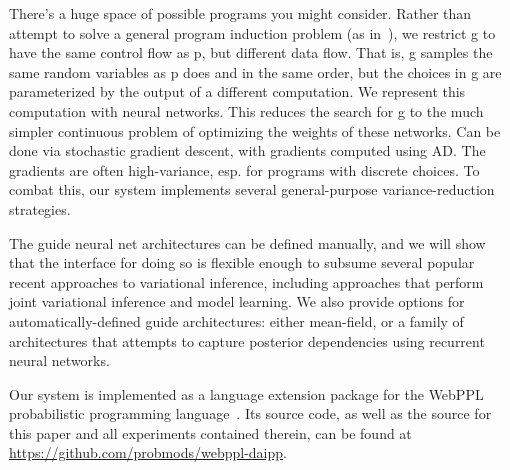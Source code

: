 There's a huge space of possible programs you might consider.
Rather than attempt to solve a general program induction problem (as in~\cite{GuidePrograms}), we restrict g to have the same control flow as p, but different data flow.
That is, g samples the same random variables as p does and in the same order, but the choices in g are parameterized by the output of a different computation.
We represent this computation with neural networks.
This reduces the search for g to the much simpler continuous problem of optimizing the weights of these networks.
Can be done via stochastic gradient descent, with gradients computed using AD.
The gradients are often high-variance, esp. for programs with discrete choices.
To combat this, our system implements several general-purpose variance-reduction strategies.

The guide neural net architectures can be defined manually, and we will show that the interface for doing so is flexible enough to subsume several popular recent approaches to variational inference, including approaches that perform joint variational inference and model learning.
We also provide options for automatically-defined guide architectures: either mean-field, or a family of architectures that attempts to capture posterior dependencies using recurrent neural networks.~

Our system is implemented as a language extension package for the WebPPL probabilistic programming language~\cite{WebPPL}. Its source code, as well as the source for this paper and all experiments contained therein, can be found at \url{https://github.com/probmods/webppl-daipp}.